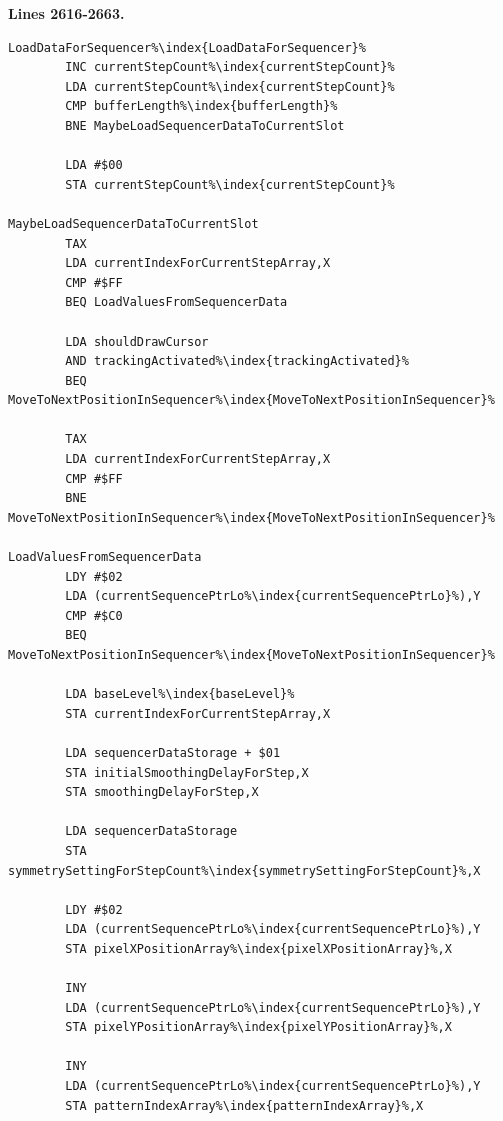 \clearpage
{}
\textbf{Lines 2616-2663. }
\begin{lstlisting}[escapechar=\%]
LoadDataForSequencer%\index{LoadDataForSequencer}%   
        INC currentStepCount%\index{currentStepCount}%
        LDA currentStepCount%\index{currentStepCount}%
        CMP bufferLength%\index{bufferLength}%
        BNE MaybeLoadSequencerDataToCurrentSlot

        LDA #$00
        STA currentStepCount%\index{currentStepCount}%

MaybeLoadSequencerDataToCurrentSlot   
        TAX 
        LDA currentIndexForCurrentStepArray,X
        CMP #$FF
        BEQ LoadValuesFromSequencerData

        LDA shouldDrawCursor
        AND trackingActivated%\index{trackingActivated}%
        BEQ MoveToNextPositionInSequencer%\index{MoveToNextPositionInSequencer}%

        TAX 
        LDA currentIndexForCurrentStepArray,X
        CMP #$FF
        BNE MoveToNextPositionInSequencer%\index{MoveToNextPositionInSequencer}%

LoadValuesFromSequencerData   
        LDY #$02
        LDA (currentSequencePtrLo%\index{currentSequencePtrLo}%),Y
        CMP #$C0
        BEQ MoveToNextPositionInSequencer%\index{MoveToNextPositionInSequencer}%

        LDA baseLevel%\index{baseLevel}%
        STA currentIndexForCurrentStepArray,X

        LDA sequencerDataStorage + $01
        STA initialSmoothingDelayForStep,X
        STA smoothingDelayForStep,X

        LDA sequencerDataStorage
        STA symmetrySettingForStepCount%\index{symmetrySettingForStepCount}%,X

        LDY #$02
        LDA (currentSequencePtrLo%\index{currentSequencePtrLo}%),Y
        STA pixelXPositionArray%\index{pixelXPositionArray}%,X

        INY 
        LDA (currentSequencePtrLo%\index{currentSequencePtrLo}%),Y
        STA pixelYPositionArray%\index{pixelYPositionArray}%,X

        INY 
        LDA (currentSequencePtrLo%\index{currentSequencePtrLo}%),Y
        STA patternIndexArray%\index{patternIndexArray}%,X

\end{lstlisting}

\clearpage

